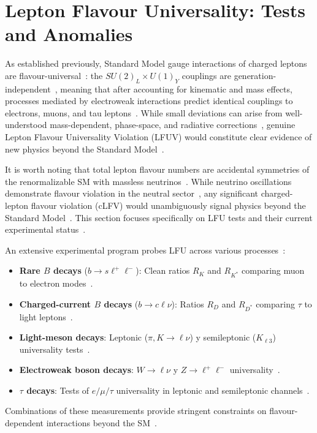 \section{Lepton Flavour Universality: Tests and Anomalies}\label{sec:LFU}

As established previously, Standard Model gauge interactions of charged leptons are flavour-universal~\cite{gl1961579,PhysRevLett.19.1264,1674-1137-40-10-100001}: the $SU(2)_L\times U(1)_Y$ couplings are generation-independent~\cite{gl1961579,PhysRevLett.19.1264}, meaning that after accounting for kinematic and mass effects, processes mediated by electroweak interactions predict identical couplings to electrons, muons, and tau leptons~\cite{1674-1137-40-10-100001}. While small deviations can arise from well-understood mass-dependent, phase-space, and radiative corrections~\cite{1674-1137-40-10-100001}, genuine Lepton Flavour Universality Violation (LFUV) would constitute clear evidence of new physics beyond the Standard Model~\cite{Hiller:2014yaa,Dorsner:2016wpm,Buttazzo:2017ixm}.

It is worth noting that total lepton flavour numbers are accidental symmetries of the renormalizable SM with massless neutrinos~\cite{1674-1137-40-10-100001}. While neutrino oscillations demonstrate flavour violation in the neutral sector~\cite{SuperK:1998osc,SNO:2002NC}, any significant charged-lepton flavour violation (cLFV) would unambiguously signal physics beyond the Standard Model~\parencite{1674-1137-40-10-100001}. This section focuses specifically on LFU tests and their current experimental status~\cite{1674-1137-40-10-100001,Ciuchini:2022wbq}.

An extensive experimental program probes LFU across various processes~\cite{1674-1137-40-10-100001}:
\begin{itemize}
  \item \textbf{Rare $B$ decays} ($b\to s\ell^+\ell^-$): Clean ratios $R_K$ and $R_{K^*}$ comparing muon to electron modes~\cite{LHCb:2014vgu,LHCb:2017avl,LHCb:2019hip,LHCb:2021trn,LHCb:2022qnv,LHCb:2022zom,Hiller:2014yaa}.
  \item \textbf{Charged-current $B$ decays} ($b\to c\ell\nu$): Ratios $R_D$ and $R_{D^*}$ comparing $\tau$ to light leptons~\cite{BaBar:2012obs,BaBar:2013mob,Belle:2015qfa,LHCb:2015gmp,LHCb:2017rln,LHCb:2023zxo,Amhis_2021}.
  \item \textbf{Light-meson decays}: Leptonic ($\pi, K\to \ell\nu$) y semileptonic ($K_{\ell3}$) universality tests~\cite{1674-1137-40-10-100001,Antonelli:2010}.
  \item \textbf{Electroweak boson decays}: $W\to \ell\nu$ y $Z\to \ell^+\ell^-$ universality~\cite{atlas2020test,LEPEW:2006}.
  \item \textbf{$\tau$ decays}: Tests of $e/\mu/\tau$ universality in leptonic and semileptonic channels~\cite{1674-1137-40-10-100001,Amhis_2021}.
\end{itemize}
Combinations of these measurements provide stringent constraints on flavour-dependent interactions beyond the SM~\parencite{1674-1137-40-10-100001}.

